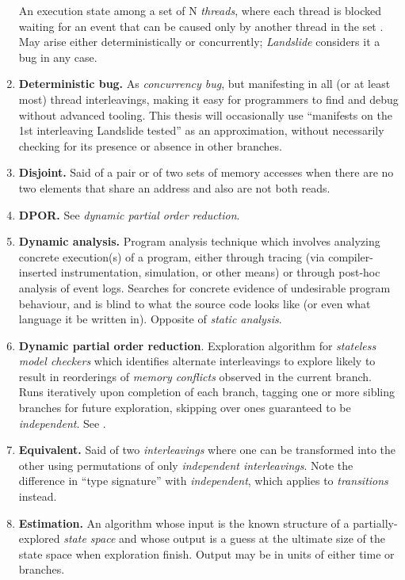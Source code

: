 \begin{enumerate}
		An execution state among a set of N {\em threads},
		where each thread is blocked waiting for an event that can be caused only by another thread in the set
		\cite{deadlock}.
		May arise either deterministically or concurrently; {\em Landslide} considers it a bug in any case.
	\item {\bf Deterministic bug.}
		As {\em concurrency bug}, but manifesting in all (or at least most) thread interleavings,
		making it easy for programmers to find and debug without advanced tooling.
		This thesis will occasionally use ``manifests on the 1st interleaving Landslide tested''
		as an approximation, without necessarily checking for its presence or absence in other branches.
	\item {\bf Disjoint.}
		Said of a pair or of two sets of memory accesses
		when there are no two elements that share an address and also are not both reads.
	\item {\bf DPOR.} See {\em dynamic partial order reduction}.
	\item {\bf Dynamic analysis.}
		Program analysis technique which involves analyzing concrete execution(s) of a program,
		either through tracing (via compiler-inserted instrumentation, simulation, or other means)
		or through post-hoc analysis of event logs.
		Searches for concrete evidence of undesirable program behaviour,
		and is blind to what the source code looks like (or even what language it be written in).
		Opposite of {\em static analysis}.
	\item {\bf Dynamic partial order reduction}.
		Exploration algorithm for {\em stateless model checkers} which
		identifies alternate interleavings to explore likely to result
		in reorderings of {\em memory conflicts} observed in the current branch.
		Runs iteratively upon completion of each branch, tagging one or more sibling branches
		for future exploration, skipping over ones guaranteed to be {\em independent}.
		See \sect{\ref{sec:landslide-dpor}}.
	\item {\bf Equivalent.}
		Said of two {\em interleavings} where one can be transformed into the other using
		permutations of only {\em independent interleavings}.
		Note the difference in ``type signature'' with {\em independent}, which applies to {\em transitions} instead.
	\item {\bf Estimation.}
		An algorithm whose input is the known structure of a partially-explored {\em state space}
		and whose output is a guess at the ultimate size of the state space when exploration finish. %
		Output may be in units of either time or branches.

\end{enumerate}
